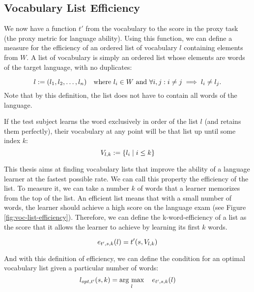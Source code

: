 \subsection{Vocabulary List Efficiency} \label{sec:voc-list-efficiency}
We now have a function $t'$ from the vocabulary to the score in the proxy task (the proxy metric for language ability).
Using this function, we can define a measure for the efficiency of an ordered list of vocabulary $l$ containing elements from $W$.
A list of vocabulary is simply an ordered list whose elements are words of the target language, with no duplicates:

\begin{equation*}
	l        := (l_1, l_2, \dots, l_n) \quad \text{where } l_i \in W \text{ and } \forall i,j: i \neq j \implies l_i \neq l_j . \\
\end{equation*}
Note that by this definition, the list does not have to contain all words of the language.

If the test subject learns the word exclusively in order of the list $l$ (and retains them perfectly), their vocabulary at any point will be that list up until some index $k$:
\begin{equation*}
	V_{l, k} := \{l_i \mid i \leq k\}                                                                                 \\
\end{equation*}


This thesis aims at finding vocabulary lists that improve the ability of a language learner at the fastest possible rate.
We can call this property the efficiency of the list.
To measure it, we can take a number $k$ of words that a learner memorizes from the top of the list.
An efficient list means that with a small number of words, the learner should achieve a high score on the language exam (see Figure \ref{fig:voc-list-efficiency}).
Therefore, we can define the k-word-efficiency of a list as the score that it allows the learner to achieve by learning its first $k$ words.

\begin{equation}
	e_{t', s, k}(l) =  t'(s,  V_{l, k})\\
\end{equation}

And with this definition of efficiency, we can define the condition for an optimal vocabulary list given a particular number of words:
\begin{equation} \label{eq:optimal-vocab-list}
	l_{opt, t'} (s, k) = \mathop{\rm arg~max}\limits_{l} \quad e_{t', s, k}(l)
\end{equation}

